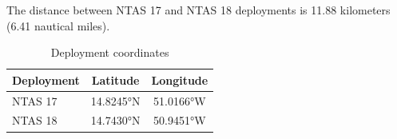 
The distance between NTAS 17 and NTAS 18 deployments is 11.88 kilometers (6.41 nautical miles).

\begin{table}[ht]
\centering
\caption{Deployment coordinates}
\begin{tabular}{lcc}
\hline
\textbf{Deployment} & \textbf{Latitude} & \textbf{Longitude} \\
\hline
NTAS 17 & 14.8245°N & 51.0166°W \\
NTAS 18 & 14.7430°N & 50.9451°W \\
\hline
\end{tabular}
\end{table}

